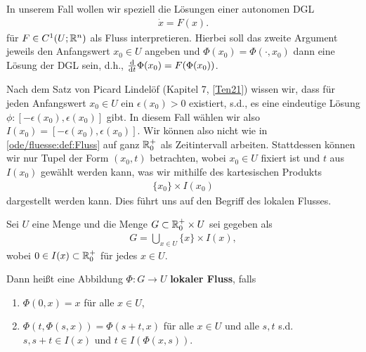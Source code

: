 In unserem Fall wollen wir speziell die Lösungen einer autonomen DGL
\begin{align*}
\dot{x} = F(x).
\end{align*}
für \(F\in C^1(U;\mathbb{R}^n)\) als Fluss interpretieren. Hierbei soll das zweite Argument jeweils den Anfangswert
\(x_0\in U\) angeben und \(\Phi(x_0) = \Phi(\cdot, x_0)\) dann eine Lösung der DGL sein, d.h., \(\frac{\mathrm{d}}{\mathrm{d} t} \Phi(x_0) = F(\Phi(x_0))\).

Nach dem Satz von Picard Lindelöf (Kapitel 7, {[}\hyperlink{cite.references:id7}{Ten21}{]}) wissen wir, dass für jeden Anfangswert \(x_0\in U\) ein \(\epsilon(x_0) >0\) existiert, s.d., es eine eindeutige Lösung \(\phi: [-\epsilon(x_0), \epsilon(x_0)]\) gibt. In diesem Fall wählen wir also \(I(x_0)=[-\epsilon(x_0), \epsilon(x_0)]\). Wir können also nicht wie in \cref{ode/fluesse:def:Fluss}  auf ganz \(\mathbb{R}^+_0\) als Zeitintervall arbeiten. Stattdessen können wir nur Tupel der Form \((x_0, t)\) betrachten, wobei \(x_0\in U\) fixiert ist und \(t\) aus \(I(x_0)\) gewählt werden kann, was wir mithilfe des kartesischen Produkts
\begin{align*}
\{x_0\}\times I(x_0)
\end{align*}
dargestellt werden kann. Dies führt uns auf den Begriff des lokalen Flusses.
\label{ode/fluesse:def:LokFluss}
\begin{definition}{}{}



Sei \(U\) eine Menge und die Menge \(G\subset \mathbb{R}^+_0\times U\) sei gegeben als
\begin{align*}
G = \bigcup_{x\in U} \{x\}\times I(x),
\end{align*}
wobei \(0\in I(x)\subset \mathbb{R}^+_0\) für jedes \(x\in U\).

Dann heißt eine Abbildung \(\Phi: G\rightarrow U\) \textbf{lokaler Fluss}, falls
\begin{enumerate}

\item {} 
\(\Phi(0,x) = x\) für alle \(x\in U\),

\item {} 
\(\Phi(t, \Phi(s, x)) = \Phi(s+t, x)\) für alle \(x\in U\) und alle \(s,t\) s.d. \(s, s+t\in I(x)\) und \(t\in I(\Phi(x,s))\).

\end{enumerate}
\end{definition}


